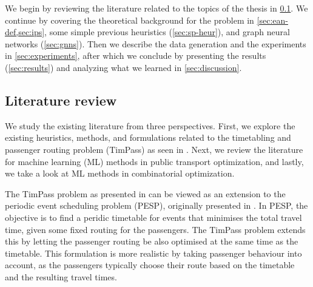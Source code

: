 \documentclass[english, 12pt, a4paper, sci, utf8, a-2b, online]{aaltothesis}
\begin{document}
We begin by reviewing the literature related to the topics of the thesis in \cref{sec:lit-review}. We continue by covering the theoretical background for the problem in \cref{sec:ean-def,sec:ips}, some simple previous heuristics (\cref{sec:sp-heur}), and graph neural networks (\cref{sec:gnns}). Then we describe the data generation and the experiments in \cref{sec:experiments}, after which we conclude by presenting the results (\cref{sec:results}) and analyzing what we learned in \cref{sec:discussion}.

\subsection{Literature review}\label{sec:lit-review}


We study the existing literature from three perspectives. First, we explore the existing heuristics, methods, and formulations related to the timetabling and passenger routing problem (TimPass) as seen in \cite{timpass-original-2014,schiewe2020periodic}. Next, we review the literature for machine learning (ML) methods in public transport optimization, and lastly, we take a look at ML methods in combinatorial optimization.








The TimPass problem as presented in \cite{timpass-original-2014} can be viewed as an extension to the periodic event scheduling problem (PESP), originally presented in \cite{pesp-original-1989}. In PESP, the objective is to find a peridic timetable for events that minimises the total travel time, given some fixed routing for the passengers. The TimPass problem extends this by letting the passenger routing be also optimised at the same time as the timetable. This formulation is more realistic by taking passenger behaviour into account, as the passengers typically choose their route based on the timetable and the resulting travel times.
\end{document}

